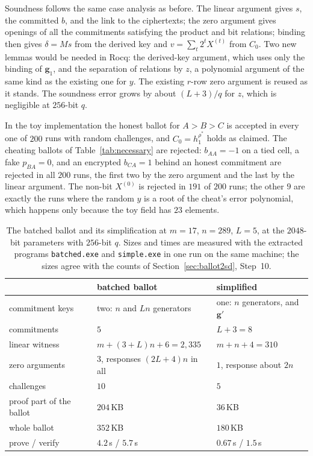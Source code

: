 \documentclass[11pt,a4paper]{article}
\newcommand{\rocq}[1]{\texttt{#1}}
\theoremstyle{remark}
\begin{document}
Soundness follows the same case analysis as before. The linear argument
gives $s$, the committed $b$, and the link to the ciphertexts; the zero
argument gives openings of all the commitments satisfying the product
and bit relations; binding then gives $\delta = Ms$ from the derived key
and $v = \sum_t 2^t X^{(t)}$ from $C_0$. Two new lemmas would be needed in
Rocq: the derived-key argument, which uses only the binding of
$\mathbf{g}_1$, and the separation of relations by $z$, a polynomial
argument of the same kind as the existing one for $y$. The existing
$r$-row zero argument is reused as it stands. The soundness error grows by
about $(L + 3)/q$ for $z$, which is negligible at $256$-bit $q$.

In the toy implementation the honest ballot for $A > B > C$ is accepted in
every one of $200$ runs with random challenges, and $C_0 = h_1^{\rho^*}$
holds as claimed. The cheating ballots of Table~\ref{tab:necessary} are
rejected: $b_{AA} = -1$ on a tied cell, a fake $p_{BA} = 0$, and an
encrypted $b_{CA} = 1$ behind an honest commitment are rejected in all
$200$ runs, the first two by the zero argument and the last by the
linear argument. The non-bit $X^{(0)}$ is rejected in $191$ of $200$ runs;
the other $9$ are exactly the runs where the random $y$ is a root of the
cheat's error polynomial, which happens only because the toy field has
$23$ elements.

\begin{table}[ht]
  \centering
  \caption{The batched ballot and its simplification at $m = 17$, $n =
  289$, $L = 5$, at the $2048$-bit parameters with $256$-bit $q$. Sizes
  and times are measured with the extracted programs \rocq{batched.exe}
  and \rocq{simple.exe} in one run on the same machine; the sizes agree
  with the counts of Section~\ref{sec:ballot2sd}, Step~10.}
  \label{tab:simpler}
  \begin{tabular}{@{}lll@{}}
    \toprule
     & batched ballot & simplified \\
    \midrule
    commitment keys & two: $n$ and $Ln$ generators & one: $n$ generators, and $\mathbf{g}'$ \\
    commitments & $5$ & $L + 3 = 8$ \\
    linear witness & $m + (3 + L)n + 6 = 2{,}335$ & $m + n + 4 = 310$ \\
    zero arguments & $3$, responses $(2L + 4)n$ in all & $1$, response about $2n$ \\
    challenges & $10$ & $5$ \\
    proof part of the ballot & $204$\,KB & $36$\,KB \\
    whole ballot & $352$\,KB & $180$\,KB \\
    prove / verify & $4.2$\,s / $5.7$\,s & $0.67$\,s / $1.5$\,s \\
    \bottomrule
  \end{tabular}
\end{table}
\end{document}
